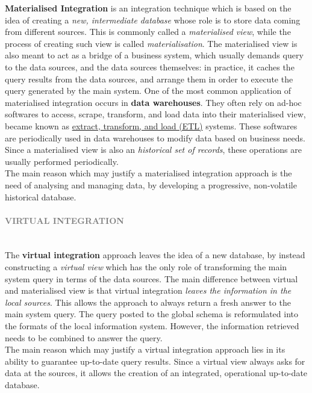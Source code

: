 \documentclass[10pt,a4paper]{article}
\newcommand{\myparagraph}[1]{\paragraph{\normalsize{\textcolor{gray}{\uppercase{\textbf{#1}}}} }\mbox{} \vspace{0.5em}\\}
\begin{document}
\begin{justify}
\textbf{Materialised Integration} is an integration technique which is based on the idea of creating a \textit{new, intermediate database} whose role is to store data coming from different sources. This is commonly called a \textit{materialised view}, while the process of creating such view is called \textit{materialisation}. The materialised view is also meant to act as a bridge of a business system, which usually demands query to the data sources, and the data sources themselves: in practice, it caches the query results from the data sources, and arrange them in order to execute the query generated by the main system. One of the most common application of materialised integration occurs in \textbf{data warehouses}. They often rely on ad-hoc softwares to access, scrape, transform, and load data into their materialised view, became known as \uline{extract, transform, and load (ETL)} systems. These softwares are periodically used in data warehouses to modify data based on business needs. Since a materialised view is also an \textit{historical set of records}, these operations are usually performed periodically. \\ The main reason which may justify a materialised integration approach is the need of analysing and managing data, by developing a progressive, non-volatile historical database.
\myparagraph{Virtual Integration}
The \textbf{virtual integration} approach leaves the idea of a new database, by instead constructing a \textit{virtual view} which has the only role of transforming the main system query in terms of the data sources. The main difference between virtual and materialised view is that virtual integration \textit{leaves the information in the local sources}. This allows the approach to always return a fresh answer to the main system query. The query posted to the global schema is reformulated into the formats of the local information system. However, the information retrieved needs to be combined to answer the query.\\ The main reason which may justify a virtual integration approach lies in its ability to guarantee up-to-date query results. Since a virtual view always asks for data at the sources, it allows the creation of an integrated, operational up-to-date database.
\end{justify}
\end{document}
